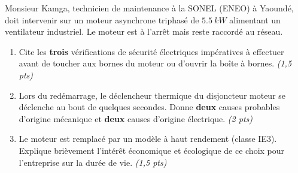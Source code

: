 \documentclass[11pt]{article}
\begin{document}
\begin{exercice}
Monsieur Kamga, technicien de maintenance à la SONEL (ENEO) à Yaoundé, doit intervenir sur un moteur asynchrone triphasé de $\SI{5,5}{kW}$ alimentant un ventilateur industriel. Le moteur est à l'arrêt mais reste raccordé au réseau.

\begin{enumerate}
    \item Cite les \textbf{trois} vérifications de sécurité électriques impératives à effectuer avant de toucher aux bornes du moteur ou d'ouvrir la boîte à bornes. \textit{(1,5 pts)}
    \item Lors du redémarrage, le déclencheur thermique du disjoncteur moteur se déclenche au bout de quelques secondes. Donne \textbf{deux} causes probables d'origine mécanique et \textbf{deux} causes d'origine électrique. \textit{(2 pts)}
    \item Le moteur est remplacé par un modèle à haut rendement (classe IE3). Explique brièvement l'intérêt économique et écologique de ce choix pour l'entreprise sur la durée de vie. \textit{(1,5 pts)}
\end{enumerate}
\end{exercice}
\end{document}

